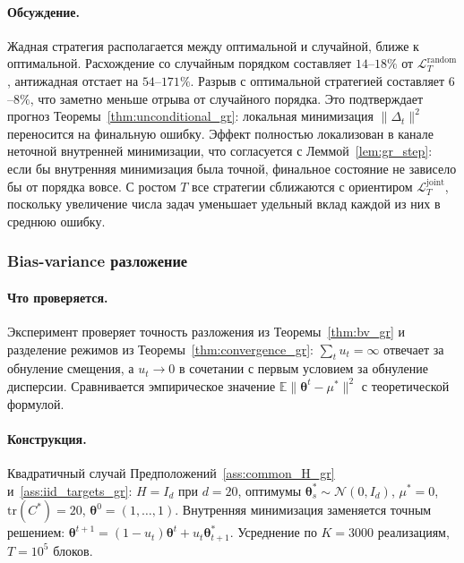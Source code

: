 \documentclass[a4paper,14pt,oneside,openany]{extarticle}
\newcommand{\cL}{\mathcal{L}}
\newcommand{\cN}{\mathcal{N}}
\newcommand{\bbE}{\mathbb{E}}
\newcommand{\btheta}{\boldsymbol{\theta}}
\begin{document}
\paragraph{Обсуждение.}
Жадная стратегия располагается между оптимальной и случайной, ближе к оптимальной. Расхождение со случайным порядком составляет $14$--$18\%$ от $\cL_T^{\mathrm{random}}$, антижадная отстает на $54$--$171\%$. Разрыв с оптимальной стратегией составляет $6$--$8\%$, что заметно меньше отрыва от случайного порядка. Это подтверждает прогноз Теоремы~\ref{thm:unconditional_gr}: локальная минимизация $\|\Delta_t\|^2$ переносится на финальную ошибку. Эффект полностью локализован в канале неточной внутренней минимизации, что согласуется с Леммой~\ref{lem:gr_step}: если бы внутренняя минимизация была точной, финальное состояние не зависело бы от порядка вовсе. С ростом $T$ все стратегии сближаются с ориентиром $\cL_T^{\mathrm{joint}}$, поскольку увеличение числа задач уменьшает удельный вклад каждой из них в среднюю ошибку.

\subsubsection{Bias-variance разложение}\label{sec:exp_bv}

\paragraph{Что проверяется.}
Эксперимент проверяет точность разложения из Теоремы~\ref{thm:bv_gr} и разделение режимов из Теоремы~\ref{thm:convergence_gr}: $\sum_t u_t = \infty$ отвечает за обнуление смещения, а $u_t \to 0$ в сочетании с первым условием за обнуление дисперсии. Сравнивается эмпирическое значение $\bbE\|\btheta^t - \mu^*\|^2$ с теоретической формулой.

\paragraph{Конструкция.}
Квадратичный случай Предположений~\ref{ass:common_H_gr} и~\ref{ass:iid_targets_gr}: $H = I_d$ при $d = 20$, оптимумы $\btheta^*_s \sim \cN(0, I_d)$, $\mu^* = 0$, $\mathrm{tr}(C^*) = 20$, $\btheta^0 = (1, \ldots, 1)$. Внутренняя минимизация заменяется точным решением: $\btheta^{t+1} = (1 - u_t)\btheta^t + u_t\btheta^*_{t+1}$. Усреднение по $K = 3000$ реализациям, $T = 10^5$ блоков.
\end{document}
